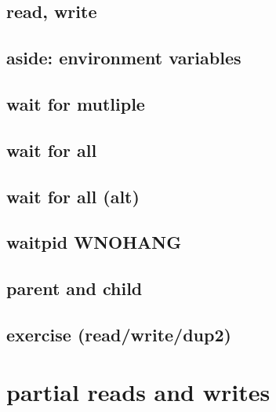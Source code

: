 

\subsection{read, write}






\subsection{aside: environment variables}


\subsection{wait for mutliple}
 

\subsection{wait for all}


\subsection{wait for all (alt)}


\subsection{waitpid WNOHANG}


\subsection{parent and child}




\subsection{exercise (read/write/dup2)}



\section{partial reads and writes}
